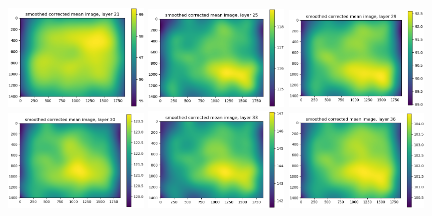 \documentclass[letterpaper,11pt]{article}
\begin{document}
\begin{figure}[!ht]
\centering
\includegraphics[width=0.32\textwidth]{images/results/unmasked_smoothed_corrected_mean_image_layers_polaris/smoothed_corrected_mean_image_layer_21}
\includegraphics[width=0.32\textwidth]{images/results/unmasked_smoothed_corrected_mean_image_layers_polaris/smoothed_corrected_mean_image_layer_25}
\includegraphics[width=0.32\textwidth]{images/results/unmasked_smoothed_corrected_mean_image_layers_polaris/smoothed_corrected_mean_image_layer_29}
\includegraphics[width=0.32\textwidth]{images/results/unmasked_smoothed_corrected_mean_image_layers_polaris/smoothed_corrected_mean_image_layer_30}
\includegraphics[width=0.32\textwidth]{images/results/unmasked_smoothed_corrected_mean_image_layers_polaris/smoothed_corrected_mean_image_layer_33}
\includegraphics[width=0.32\textwidth]{images/results/unmasked_smoothed_corrected_mean_image_layers_polaris/smoothed_corrected_mean_image_layer_36}

\end{figure}
\end{document}

